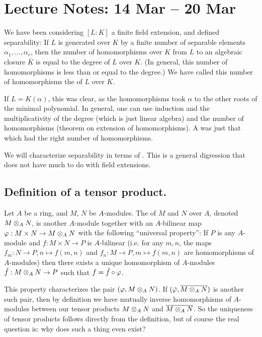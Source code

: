\section[Tensor product. Structure of finite $K$-algebras.]{Lecture Notes: 14 Mar -- 20 Mar}
We have been considering $[L:K]$ a finite field extension, and defined separability: If $L$ is generated over $K$ by a finite number of separable elements $\alpha_1,\dotsc,\alpha_r$, then the number of homomorphisms over $K$ from $L$ to an algebraic closure $\bar{K}$ is equal to the degree of $L$ over $K$. (In general, this number of homomorphisms is less than or equal to the degree.) We have called this number of homomorphisms the  of $L$ over $K$.

If $L = K(\alpha)$, this was clear, as the homomorphisms took $\alpha$ to the other roots of the minimal polynomial. In general, one can use induction and the multiplicativity of the degree (which is just linear algebra) and the number of homomorphisms (theorem on extension of homomorphisms). A  was just that which had the right number of homomorphisms.

We will characterize separability in terms of . This is a general digression that does not have much to do with field extensions.

\subsection{Definition of a tensor product.}
\begin{dfn}
Let $A$ be a ring, and $M$, $N$ be $A$-modules. The  of $M$ and $N$ over $A$, denoted $M \otimes_{A} N$, is another $A$-module together with an $A$-bilinear map $\varphi: M \times N \to M \otimes_{A} N$ with the following ``universal property'': If $P$ is any $A$-module and $f: M \times N \to P$ is $A$-bilinear (i.e. for any $m, n$, the maps $f_m: N \to P, n \mapsto f(m, n)$ and $f_n: M \to P, m \mapsto f(m, n)$ are homomorphisms of $A$-modules) then there exists a unique homomorphism of $A$-modules $\tilde{f}: M \otimes_{A} N \to P$ such that $f = \tilde{f} \circ \varphi$.
\end{dfn}

This property characterizes the pair $(\varphi, M \otimes_{A} N)$. If $(\bar{\varphi}, \overline{M \otimes_{A} N})$ is another such pair, then by definition we have mutually inverse homomorphisms of $A$-modules between our tensor products $M \otimes_{A} N$ and $\overline{M \otimes_{A} N}$. So the uniqueness of tensor products follows directly from the definition, but of course the real question is: why does such a thing even exist?

